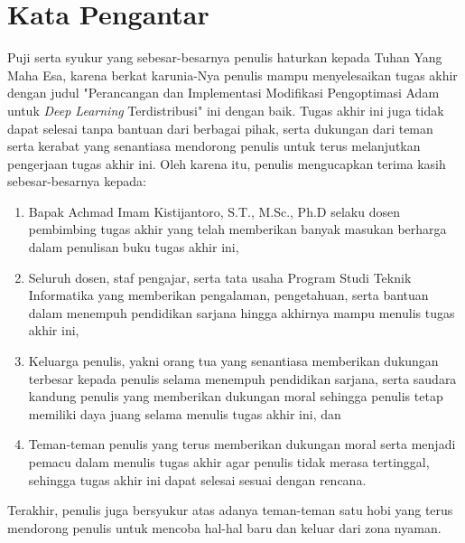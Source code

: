 \chapter*{Kata Pengantar}

Puji serta syukur yang sebesar-besarnya penulis haturkan kepada Tuhan Yang Maha Esa, karena berkat karunia-Nya penulis mampu menyelesaikan tugas akhir dengan judul "Perancangan dan Implementasi Modifikasi Pengoptimasi Adam untuk \emph{Deep Learning} Terdistribusi" ini dengan baik. Tugas akhir ini juga tidak dapat selesai tanpa bantuan dari berbagai pihak, serta dukungan dari teman serta kerabat yang senantiasa mendorong penulis untuk terus melanjutkan pengerjaan tugas akhir ini. Oleh karena itu, penulis mengucapkan terima kasih sebesar-besarnya kepada:

\begin{enumerate}
  \item Bapak Achmad Imam Kistijantoro, S.T., M.Sc., Ph.D selaku dosen pembimbing tugas akhir yang telah memberikan banyak masukan berharga dalam penulisan buku tugas akhir ini,
  \item Seluruh dosen, staf pengajar, serta tata usaha Program Studi Teknik Informatika yang memberikan pengalaman, pengetahuan, serta bantuan dalam menempuh pendidikan sarjana hingga akhirnya mampu menulis tugas akhir ini,
  \item Keluarga penulis, yakni orang tua yang senantiasa memberikan dukungan terbesar kepada penulis selama menempuh pendidikan sarjana, serta saudara kandung penulis yang memberikan dukungan moral sehingga penulis tetap memiliki daya juang selama menulis tugas akhir ini, dan
  \item Teman-teman penulis yang terus memberikan dukungan moral serta menjadi pemacu dalam menulis tugas akhir agar penulis tidak merasa tertinggal, sehingga tugas akhir ini dapat selesai sesuai dengan rencana.
\end{enumerate}

Terakhir, penulis juga bersyukur atas adanya teman-teman satu hobi yang terus mendorong penulis untuk mencoba hal-hal baru dan keluar dari zona nyaman.

